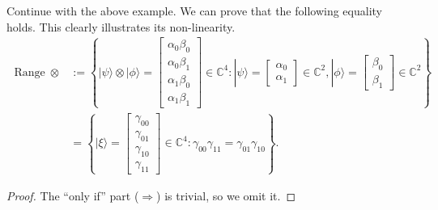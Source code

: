 \begin{example}
    Continue with the above example. We can prove that the following equality holds. This clearly illustrates its non-linearity.
        \begin{align}
        \operatorname{Range} \otimes & :=\left\{|\psi\rangle \otimes|\phi\rangle=\left[\begin{array}{l}
        \alpha_0\beta_0 \\
        \alpha_0\beta_1 \\
        \alpha_1\beta_0 \\
        \alpha_1\beta_1
        \end{array}\right] \in \mathbb{C}^4:
        |\psi\rangle=\left[\begin{array}{l}
        \alpha_0 \\
        \alpha_1
        \end{array}\right] \in \mathbb{C}^2,
        |\phi\rangle=\left[\begin{array}{l}
        \beta_0 \\
        \beta_1
        \end{array}\right] \in \mathbb{C}^2
        \right\} \\
        & =\left\{|\xi\rangle=\left[\begin{array}{l}\gamma_{00} \\ \gamma_{01} \\ \gamma_{10} \\ \gamma_{11} \end{array}\right] \in \mathbb{\mathbb { C }}^{4}: \gamma_{00} \gamma_{11}=\gamma_{01} \gamma_{10}\right\}. \label{set2}
        \end{align}
    \begin{proof}
        The ``only if'' part ($\Longrightarrow$) is trivial, so we omit it. 
        

\end{proof}
\end{example}
